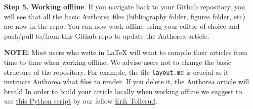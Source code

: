 \textbf{Step 5. Working offline}. If you navigate back to your Github repository, you will see that all the basic Authorea files (bibliography folder, figures folder, etc) are now in the repo. You can now work offline using your editor of choice and push/pull to/from this Github repo to update the Authorea article. 

\textbf{NOTE:} Most users who write in LaTeX will want to compile their articles from time to time when working offline. We advise users not to change the basic structure of the repository. For example, the file \verb|layout.md| is crucial as it instructs Authorea what files to render. If you delete it, the Authorea article will break! In order to build your article locally when working offline we suggest to use \href{https://gist.github.com/eteq/1d7b138b9c4e80231f6f}{this Python script} by our fellow \href{https://gist.github.com/eteq}{Erik Tollerud}. 
